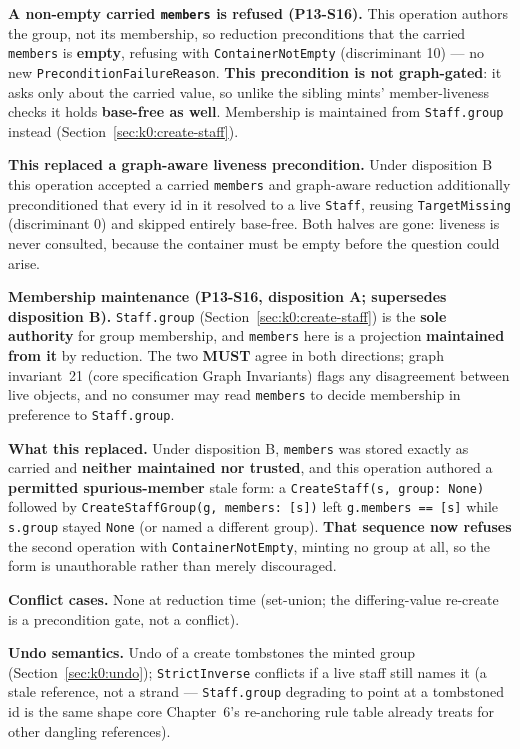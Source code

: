 \documentclass[11pt,letterpaper]{report}
\newcommand{\sectionsc}[1]{{\addfontfeatures{Letters=SmallCaps}#1}}
\newcommand{\MUST}{\textbf{MUST}}
\begin{document}
\textbf{A non-empty carried \texttt{members} is refused (P13-S16).} This
operation authors the group, not its membership, so reduction preconditions that
the carried \texttt{members} is \textbf{empty}, refusing with
\texttt{ContainerNotEmpty} (discriminant 10) --- no new
\texttt{PreconditionFailureReason}. \textbf{This precondition is not
graph-gated}: it asks only about the carried value, so unlike the sibling mints'
member-liveness checks it holds \textbf{base-free as well}. Membership is
maintained from \texttt{Staff.group} instead
(Section~\ref{sec:k0:create-staff}).

\textbf{This replaced a graph-aware liveness precondition.} Under disposition B
this operation accepted a carried \texttt{members} and graph-aware reduction
additionally preconditioned that every id in it resolved to a live
\texttt{Staff}, reusing \texttt{TargetMissing} (discriminant 0) and skipped
entirely base-free. Both halves are gone: liveness is never consulted, because
the container must be empty before the question could arise.

\textbf{Membership maintenance (P13-S16, disposition A; supersedes disposition
B).} \texttt{Staff.group} (Section~\ref{sec:k0:create-staff}) is the
\textbf{sole authority} for group membership, and \texttt{members} here is a
projection \textbf{maintained from it} by reduction. The two \MUST{} agree in
both directions; graph invariant~21 (core specification \sectionsc{Graph
Invariants}) flags any disagreement between live objects, and no consumer may
read \texttt{members} to decide membership in preference to
\texttt{Staff.group}.

\textbf{What this replaced.} Under disposition B, \texttt{members} was stored
exactly as carried and \textbf{neither maintained nor trusted}, and this
operation authored a \textbf{permitted spurious-member} stale form: a
\texttt{CreateStaff(s, group: None)} followed by
\texttt{CreateStaffGroup(g, members: [s])} left \texttt{g.members == [s]} while
\texttt{s.group} stayed \texttt{None} (or named a different group).
\textbf{That sequence now refuses} the second operation with
\texttt{ContainerNotEmpty}, minting no group at all, so the form is
unauthorable rather than merely discouraged.

\textbf{Conflict cases.} None at reduction time (set-union; the differing-value
re-create is a precondition gate, not a conflict).

\textbf{Undo semantics.} Undo of a create tombstones the minted group
(Section~\ref{sec:k0:undo}); \texttt{StrictInverse} conflicts if a live staff
still names it (a stale reference, not a strand --- \texttt{Staff.group}
degrading to point at a tombstoned id is the same shape core Chapter~6's
re-anchoring rule table already treats for other dangling references).
\end{document}
